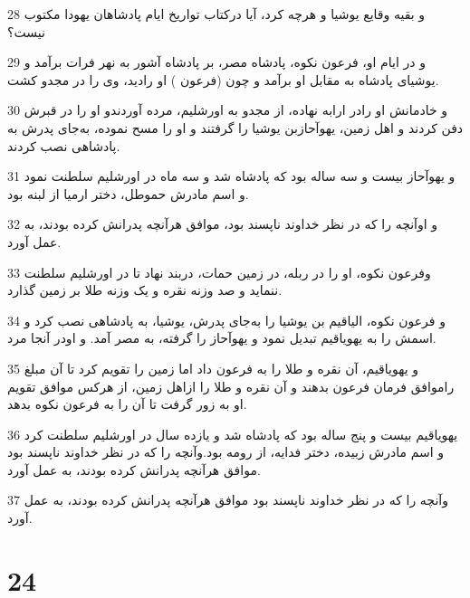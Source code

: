 \par 28 و بقیه وقایع یوشیا و هرچه کرد، آیا درکتاب تواریخ ایام پادشاهان یهودا مکتوب نیست؟
\par 29 و در ایام او، فرعون نکوه، پادشاه مصر، بر پادشاه آشور به نهر فرات برآمد و یوشیای پادشاه به مقابل او برآمد و چون (فرعون ) او رادید، وی را در مجدو کشت.
\par 30 و خادمانش او رادر ارابه نهاده، از مجدو به اورشلیم، مرده آوردندو او را در قبرش دفن کردند و اهل زمین، یهوآحازبن یوشیا را گرفتند و او را مسح نموده، به‌جای پدرش به پادشاهی نصب کردند.
\par 31 و یهوآحاز بیست و سه ساله بود که پادشاه شد و سه ماه در اورشلیم سلطنت نمود و اسم مادرش حموطل، دختر ارمیا از لبنه بود.
\par 32 و اوآنچه را که در نظر خداوند ناپسند بود، موافق هرآنچه پدرانش کرده بودند، به عمل آورد.
\par 33 وفرعون نکوه، او را در ربله، در زمین حمات، دربند نهاد تا در اورشلیم سلطنت ننماید و صد وزنه نقره و یک وزنه طلا بر زمین گذارد.
\par 34 و فرعون نکوه، الیاقیم بن یوشیا را به‌جای پدرش، یوشیا، به پادشاهی نصب کرد و اسمش را به یهویاقیم تبدیل نمود و یهوآحاز را گرفته، به مصر آمد. و اودر آنجا مرد.
\par 35 و یهویاقیم، آن نقره و طلا را به فرعون داد اما زمین را تقویم کرد تا آن مبلغ راموافق فرمان فرعون بدهند و آن نقره و طلا را ازاهل زمین، از هرکس موافق تقویم او به زور گرفت تا آن را به فرعون نکوه بدهد.
\par 36 یهویاقیم بیست و پنج ساله بود که پادشاه شد و یازده سال در اورشلیم سلطنت کرد و اسم مادرش زبیده، دختر فدایه، از رومه بود.وآنچه را که در نظر خداوند ناپسند بود موافق هرآنچه پدرانش کرده بودند، به عمل آورد.
\par 37 وآنچه را که در نظر خداوند ناپسند بود موافق هرآنچه پدرانش کرده بودند، به عمل آورد.
 
\chapter{24}

